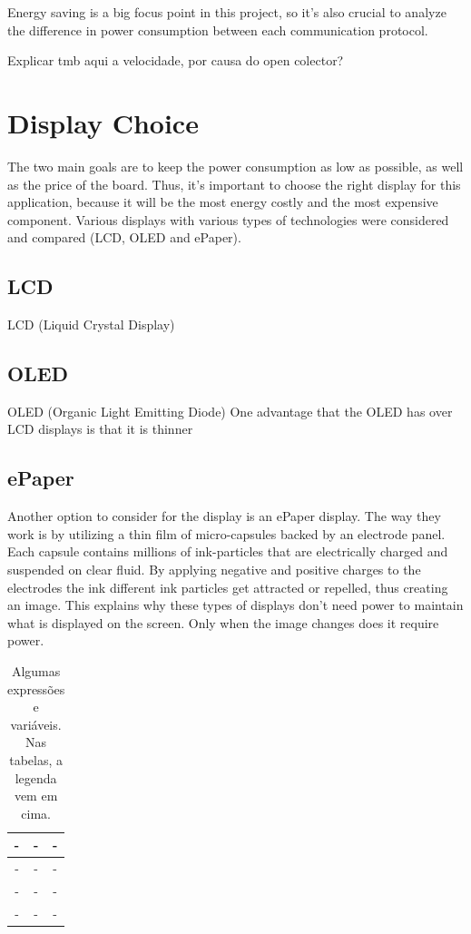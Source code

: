 \documentclass[english]{ist-thesis}
\begin{document}
Energy saving is a big focus point in this project, so it's also crucial to analyze the difference in power consumption between each communication protocol.

Explicar tmb aqui a velocidade, por causa do open colector?

\section{Display Choice}

The two main goals are to keep the power consumption as low as possible, as well as the price of the board. Thus, it's important to choose the right display for this application, because it will be the most energy costly and the most expensive component. Various displays with various types of technologies were considered and compared (LCD, OLED and ePaper). 

\subsection{LCD}
LCD (Liquid Crystal Display) 

\subsection{OLED}
OLED (Organic Light Emitting Diode)
One advantage that the OLED has over LCD displays is that it is thinner

\subsection{ePaper}
Another option to consider for the display is an ePaper display. 
The way they work is by utilizing a thin film of micro-capsules backed by an electrode panel. Each capsule contains millions of ink-particles that are electrically charged and suspended on clear fluid. By applying negative and positive charges to the electrodes the ink different ink particles get attracted or repelled, thus creating an image. This explains why these types of displays don't need power to maintain what is displayed on the screen. Only when the image changes does it require power. 

\begin{table}[ht]
	\centering                 
	\caption{Algumas expressões e variáveis. Nas tabelas, a legenda vem em cima.}
	\begin{tabular}{| c | c | c |}
            \hline
		- & - & - \\
		\hline
		- & - & - \\
		\hline
		- & - & - \\
		\hline
		- & - & - \\
		\hline
	\end{tabular}
	\label{tab:displays}
\end{table}
\end{document}
